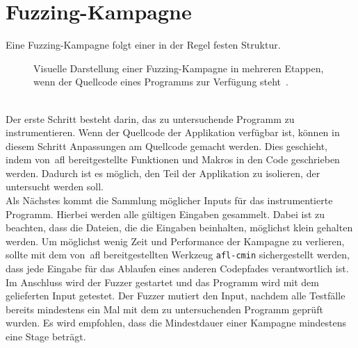 
\section{Fuzzing-Kampagne}\label{sec: fuzzing-kampagne}
Eine Fuzzing-Kampagne folgt einer in der Regel festen Struktur.
\begin{figure}[h]
    \caption{Visuelle Darstellung einer Fuzzing-Kampagne in mehreren Etappen, wenn der Quellcode eines Programms zur Verfügung steht~\cite{fuzzing-process-image}.}\label{fig:fuzzing-zyklus}
\end{figure}\\
Der erste Schritt besteht darin, das zu untersuchende Programm zu instrumentieren.
Wenn der Quellcode der Applikation verfügbar ist, können in diesem Schritt Anpassungen am Quellcode gemacht werden.
Dies geschieht, indem von~\gls{afl} bereitgestellte Funktionen und Makros in den Code geschrieben werden.
Dadurch ist es möglich, den Teil der Applikation zu isolieren, der untersucht werden soll.\\
\linebreak
Als Nächstes kommt die Sammlung möglicher Inputs für das instrumentierte Programm.
Hierbei werden alle gültigen Eingaben gesammelt.
Dabei ist zu beachten, dass die Dateien, die die Eingaben beinhalten, möglichst klein gehalten werden.
Um möglichst wenig Zeit und Performance der Kampagne zu verlieren, sollte mit dem von~\gls{afl} bereitgestellten Werkzeug
\texttt{afl-cmin} sichergestellt werden, dass jede Eingabe für das Ablaufen eines anderen Codepfades verantwortlich ist.\\
\linebreak
Im Anschluss wird der Fuzzer gestartet und das Programm wird mit dem gelieferten Input getestet.
Der Fuzzer mutiert den Input, nachdem alle Testfälle bereits mindestens ein Mal mit dem zu untersuchenden Programm
geprüft wurden.
Es wird empfohlen, dass die Mindestdauer einer Kampagne mindestens eine Stage beträgt.
